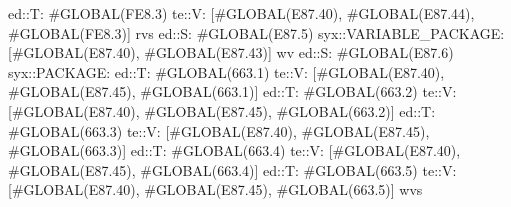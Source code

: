                                                                                 ed::T: #GLOBAL(FE8.3)
                                                                                 te::V:
                                                                                 [#GLOBAL(E87.40), #GLOBAL(E87.44), #GLOBAL(FE8.3)]
                                                                             rvs
                                                                            ed::S: #GLOBAL(E87.5)
                                                                             syx::VARIABLE_PACKAGE:
                                                                             [#GLOBAL(E87.40), #GLOBAL(E87.43)]
                                                                             wv
                                                                            ed::S: #GLOBAL(E87.6)
                                                                             syx::PACKAGE:
                                                                                ed::T: #GLOBAL(663.1)
                                                                                 te::V:
                                                                                 [#GLOBAL(E87.40), #GLOBAL(E87.45), #GLOBAL(663.1)]
                                                                                ed::T: #GLOBAL(663.2)
                                                                                 te::V:
                                                                                 [#GLOBAL(E87.40), #GLOBAL(E87.45), #GLOBAL(663.2)]
                                                                                ed::T: #GLOBAL(663.3)
                                                                                 te::V:
                                                                                 [#GLOBAL(E87.40), #GLOBAL(E87.45), #GLOBAL(663.3)]
                                                                                ed::T: #GLOBAL(663.4)
                                                                                 te::V:
                                                                                 [#GLOBAL(E87.40), #GLOBAL(E87.45), #GLOBAL(663.4)]
                                                                                ed::T: #GLOBAL(663.5)
                                                                                 te::V:
                                                                                 [#GLOBAL(E87.40), #GLOBAL(E87.45), #GLOBAL(663.5)]
                                                                             wvs
